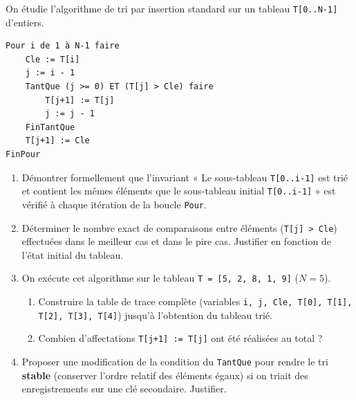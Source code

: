 \documentclass[11pt]{article}
\begin{document}
\begin{exercice}
On étudie l'algorithme de tri par insertion standard sur un tableau \texttt{T[0..N-1]} d'entiers.

\begin{verbatim}
Pour i de 1 à N-1 faire
    Cle := T[i]
    j := i - 1
    TantQue (j >= 0) ET (T[j] > Cle) faire
        T[j+1] := T[j]
        j := j - 1
    FinTantQue
    T[j+1] := Cle
FinPour
\end{verbatim}

\begin{enumerate}
    \item Démontrer formellement que l'invariant « Le sous-tableau \texttt{T[0..i-1]} est trié et contient les mêmes éléments que le sous-tableau initial \texttt{T[0..i-1]} » est vérifié à chaque itération de la boucle \texttt{Pour}.
    \item Déterminer le nombre exact de comparaisons entre éléments (\texttt{T[j] > Cle}) effectuées dans le meilleur cas et dans le pire cas. Justifier en fonction de l'état initial du tableau.
    \item On exécute cet algorithme sur le tableau \texttt{T = [5, 2, 8, 1, 9]} ($N=5$). 
    \begin{enumerate}
        \item Construire la table de trace complète (variables \texttt{i, j, Cle, T[0], T[1], T[2], T[3], T[4]}) jusqu'à l'obtention du tableau trié.
        \item Combien d'affectations \texttt{T[j+1] := T[j]} ont été réalisées au total ?
    \end{enumerate}
    \item Proposer une modification de la condition du \texttt{TantQue} pour rendre le tri \textbf{stable} (conserver l'ordre relatif des éléments égaux) si on triait des enregistrements sur une clé secondaire. Justifier.
\end{enumerate}
\end{exercice}
\end{document}
